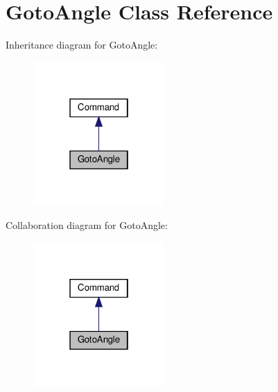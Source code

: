 \hypertarget{classGotoAngle}{}\section{Goto\+Angle Class Reference}
\label{classGotoAngle}


Inheritance diagram for Goto\+Angle\+:
\nopagebreak
\begin{figure}[H]
\begin{center}
\leavevmode
\includegraphics[width=142pt]{classGotoAngle__inherit__graph}
\end{center}
\end{figure}


Collaboration diagram for Goto\+Angle\+:
\nopagebreak
\begin{figure}[H]
\begin{center}
\leavevmode
\includegraphics[width=142pt]{classGotoAngle__coll__graph}
\end{center}
\end{figure}
